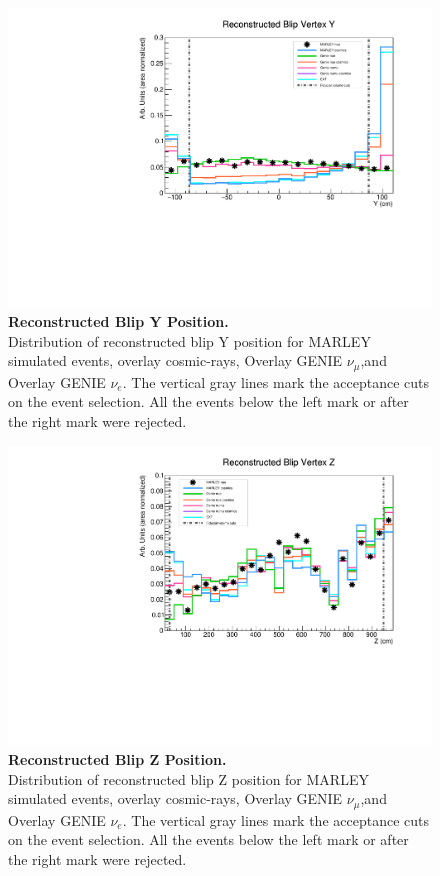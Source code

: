 \begin{figure}[h!]
    \centering
    \includegraphics[width=120mm]{Figures/vertex_Y.pdf}
    \caption[Reconstructed Blip Y Position.]{{\textbf{Reconstructed Blip Y Position.}}\\ Distribution of reconstructed blip Y position for MARLEY simulated events, overlay cosmic-rays, Overlay GENIE $\nu_{\mu}$,and Overlay GENIE $\nu_{e}$. The vertical gray lines mark the acceptance cuts on the event selection. All the events below the left mark or after the right mark were rejected.}
    \label{vertex_Y}
\end{figure}

\begin{figure}[h!]
    \centering
    \includegraphics[width=120mm]{Figures/vertex_Z.pdf}
    \caption[Reconstructed Blip Z Position.]{{\textbf{Reconstructed Blip Z Position.}}\\ Distribution of reconstructed blip Z position for MARLEY simulated events, overlay cosmic-rays, Overlay GENIE $\nu_{\mu}$,and Overlay GENIE $\nu_{e}$. The vertical gray lines mark the acceptance cuts on the event selection. All the events below the left mark or after the right mark were rejected.}
    \label{vertex_Z}
\end{figure}

